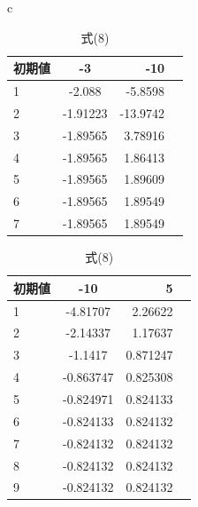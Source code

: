 \documentclass{jsarticle}
\begin{document}
\begin{table}[htbp]
\begin{center}
\begin{tabular}{c}
        \end{tabular}
    \end{center}
\end{table}

\begin{table}[htbp]
    \begin{center}
        \begin{tabular}{c}

            \begin{minipage}{0.3\hsize}
                \begin{center}
                    \begin{tabular}{|l|c|r||r|} \hline
                        初期値 & -3 & -10 \\ \hline \hline
                        1 & -2.088 & -5.8598\\ \hline
                        2 & -1.91223 &   -13.9742\\ \hline
                        3 & -1.89565 &   3.78916\\ \hline
                        4 & -1.89565 &   1.86413\\ \hline
                        5 & -1.89565 &   1.89609\\ \hline
                        6 & -1.89565 &   1.89549\\ \hline
                        7 & -1.89565 &   1.89549\\ \hline
                    \end{tabular}
                    \caption{式(7)}
                \end{center}
            \end{minipage}

            \begin{minipage}{0.3\hsize}
                \begin{center}
                    \begin{tabular}{|l|c|r||r|} \hline
                        初期値 & -10 & 5 \\ \hline \hline
                        1 &  -4.81707  &  2.26622\\ \hline
                        2 &  -2.14337  &  1.17637\\ \hline
                        3 &  -1.1417 & 0.871247\\ \hline
                        4 &  -0.863747 &  0.825308\\ \hline
                        5 &  -0.824971 &  0.824133\\ \hline
                        6 &  -0.824133 &  0.824132\\ \hline
                        7 &  -0.824132 &  0.824132\\ \hline
                        8 &  -0.824132 &  0.824132\\ \hline
                        9 &  -0.824132 &  0.824132\\ \hline
                    \end{tabular}
                    \caption{式(8)}
                \end{center}
            \end{minipage}


\end{tabular}
\end{center}
\end{table}
\end{document}
